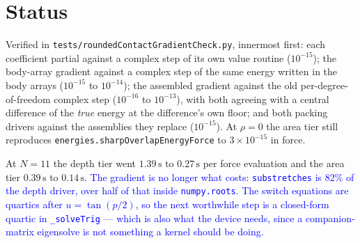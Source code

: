 \documentclass[11pt]{article}
\newcommand{\code}[1]{\texttt{#1}}
\newcommand{\note}[1]{\textcolor{blue}{#1}}
\begin{document}
\section{Status}

Verified in \code{tests/roundedContactGradientCheck.py}, innermost first: each coefficient partial
against a complex step of its own value routine ($10^{-15}$); the body-array gradient against a
complex step of the same energy written in the body arrays ($10^{-15}$ to $10^{-14}$); the assembled
gradient against the old per-degree-of-freedom complex step ($10^{-16}$ to $10^{-13}$), with both
agreeing with a central difference of the \emph{true} energy at the difference's own floor; and both
packing drivers against the assemblies they replace ($10^{-15}$). At $\rho=0$ the area tier still
reproduces \code{energies.sharpOverlapEnergyForce} to $3\times10^{-15}$ in force.

At $N=11$ the depth tier went $1.39\,\mathrm{s}$ to $0.27\,\mathrm{s}$ per force evaluation and the
area tier $0.39\,\mathrm{s}$ to $0.14\,\mathrm{s}$. \note{The gradient is no longer what costs:
\code{substretches} is $82\%$ of the depth driver, over half of that inside \code{numpy.roots}. The
switch equations are quartics after $u=\tan(p/2)$, so the next worthwhile step is a closed-form
quartic in \code{\_solveTrig} --- which is also what the device needs, since a companion-matrix
eigensolve is not something a kernel should be doing.}
\end{document}
